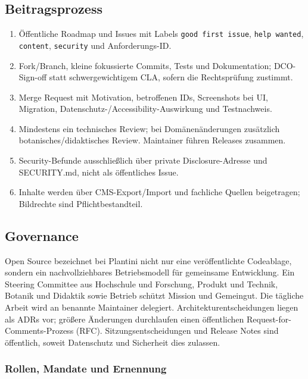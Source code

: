 \documentclass[10pt,a4paper,oneside]{article}
\newcommand{\Code}[1]{\texttt{\small #1}}
\begin{document}
\subsection{Beitragsprozess}

\begin{enumerate}[leftmargin=7mm,label=\textcolor{Forest}{\arabic*.}]
  \item Öffentliche Roadmap und Issues mit Labels \Code{good first issue}, \Code{help wanted}, \Code{content}, \Code{security} und Anforderungs-ID.
  \item Fork/Branch, kleine fokussierte Commits, Tests und Dokumentation; DCO-Sign-off statt schwergewichtigem CLA, sofern die Rechtsprüfung zustimmt.
  \item Merge Request mit Motivation, betroffenen IDs, Screenshots bei UI, Migration, Datenschutz-/Accessibility-Auswirkung und Testnachweis.
  \item Mindestens ein technisches Review; bei Domänenänderungen zusätzlich botanisches/didaktisches Review. Maintainer führen Releases zusammen.
  \item Security-Befunde ausschließlich über private Disclosure-Adresse und SECURITY.md, nicht als öffentliches Issue.
  \item Inhalte werden über CMS-Export/Import und fachliche Quellen beigetragen; Bildrechte sind Pflichtbestandteil.
\end{enumerate}

\subsection{Governance}

Open Source bezeichnet bei Plantini nicht nur eine veröffentlichte Codeablage, sondern ein nachvollziehbares Betriebsmodell für gemeinsame Entwicklung. Ein Steering Committee aus Hochschule und Forschung, Produkt und Technik, Botanik und Didaktik sowie Betrieb schützt Mission und Gemeingut. Die tägliche Arbeit wird an benannte Maintainer delegiert. Architekturentscheidungen liegen als ADRs vor; größere Änderungen durchlaufen einen öffentlichen Request-for-Comments-Prozess (RFC). Sitzungsentscheidungen und Release Notes sind öffentlich, soweit Datenschutz und Sicherheit dies zulassen.

\subsubsection{Rollen, Mandate und Ernennung}
\end{document}
